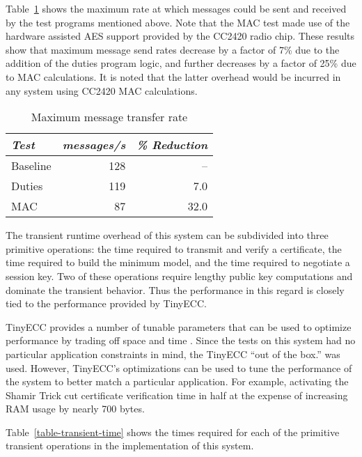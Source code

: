 Table~\ref{table-steady-state} shows the maximum rate at which messages could be sent and
received by the test programs mentioned above. Note that the MAC test made use of the hardware
assisted AES support provided by the CC2420 radio chip. These results show that maximum message
send rates decrease by a factor of 7\% due to the addition of the duties program logic, and
further decreases by a factor of 25\% due to MAC calculations. It is noted that the latter
overhead would be incurred in any system using CC2420 MAC calculations.

\begin{table}[!t]
  \newcommand\T{\rule{0pt}{2.1ex}}
  \centering
  \caption{Maximum message transfer rate}
  {
  \begin{tabular}{|l|r|r|} \hline
    \textit{Test} \T & \textit{messages/s} & \textit{\% Reduction} \\
    \hline \hline

    Baseline \T & 128 &   -- \\ \hline 
    Duties   \T & 119 &  7.0 \\ \hline
    MAC      \T &  87 & 32.0 \\ \hline
  \end{tabular}
  }
  \label{table-steady-state}
\end{table}

The transient runtime overhead of this system can be subdivided into three primitive operations:
the time required to transmit and verify a certificate, the time required to build the minimum
model, and the time required to negotiate a session key. Two of these operations require lengthy
public key computations and dominate the transient behavior. Thus the performance in this regard
is closely tied to the performance provided by TinyECC.

TinyECC provides a number of tunable parameters that can be used to optimize performance by
trading off space and time \cite{Liu-Peng-TinyECC-2008}. Since the tests on this system had no
particular application constraints in mind, the TinyECC ``out of the box.'' was used. However,
TinyECC's optimizations can be used to tune the performance of the system to better match a
particular application. For example, activating the Shamir Trick cut certificate verification
time in half at the expense of increasing RAM usage by nearly 700 bytes.

Table~\ref{table-transient-time} shows the times required for each of the primitive transient
operations in the implementation of this system.

